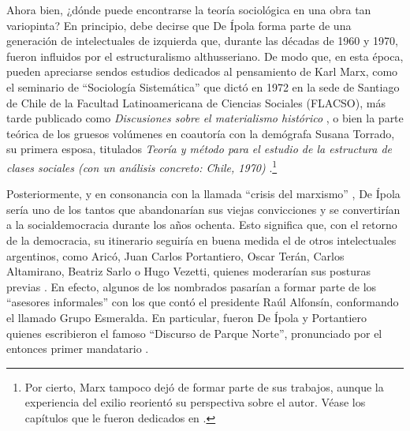 Ahora bien, ¿dónde puede encontrarse la teoría sociológica en una obra tan variopinta? En principio, debe decirse que De Ípola forma parte de una generación de intelectuales de izquierda que, durante las décadas de 1960 y 1970, fueron influidos por el estructuralismo althusseriano. De modo que, en esta época, pueden apreciarse sendos estudios dedicados al pensamiento de Karl Marx, como el seminario de \enquote{Sociología Sistemática} que dictó en 1972 en la sede de Santiago de Chile de la Facultad Latinoamericana de Ciencias Sociales (FLACSO), más tarde publicado como \emph{Discusiones sobre el materialismo histórico} \parencite{1599-DEIPOLA1974}, o bien la parte teórica de los gruesos volúmenes en coautoría con la demógrafa Susana Torrado, su primera esposa, titulados \emph{Teoría y método para el estudio de la estructura de clases sociales (con un análisis concreto: Chile, 1970)} \parencite{1505-TORRADO1976}.\footnote{Por cierto, Marx tampoco dejó de formar parte de sus trabajos, aunque la experiencia del exilio reorientó su perspectiva sobre el autor. Véase los capítulos que le fueron dedicados en \textcite{1592-DEIPOLA1997,1600-DEIPOLA2001}.}

Posteriormente, y en consonancia con la llamada \enquote{crisis del marxismo} \parencite{279-ANDERSON2011}, De Ípola sería uno de los tantos que abandonarían sus viejas convicciones y se convertirían a la socialdemocracia durante los años ochenta. Esto significa que, con el retorno de la democracia, su itinerario seguiría en buena medida el de otros intelectuales argentinos, como Aricó, Juan Carlos Portantiero, Oscar Terán, Carlos Altamirano, Beatriz Sarlo o Hugo Vezetti, quienes moderarían sus posturas previas \parencite{1446-BURGOS2004}. En efecto, algunos de los nombrados pasarían a formar parte de los \enquote{asesores informales} con los que contó el presidente Raúl Alfonsín, conformando el llamado Grupo Esmeralda. En particular, fueron De Ípola y Portantiero quienes escribieron el famoso \enquote{Discurso de Parque Norte}, pronunciado por el entonces primer mandatario \parencite{1525-RINESI2004,1601-DEIPOLA1994,1602-DEIPOLA2004}.

